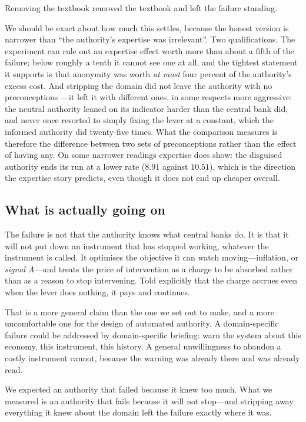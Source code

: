 \documentclass[11pt]{article}
\begin{document}
Removing the textbook removed the textbook and left the failure standing.

We should be exact about how much this settles, because the honest version is narrower than ``the
authority's expertise was irrelevant''. Two qualifications. The experiment can rule out an expertise
effect worth more than about a fifth of the failure; below roughly a tenth it cannot see one at all,
and the tightest statement it supports is that anonymity was worth \emph{at most} four percent of the
authority's excess cost. And stripping the domain did not leave the authority with no preconceptions
---it left it with different ones, in some respects more aggressive: the neutral authority leaned on
its indicator harder than the central bank did, and never once resorted to simply fixing the lever at
a constant, which the informed authority did twenty-five times. What the comparison measures is
therefore the difference between two sets of preconceptions rather than the effect of having any. On
some narrower readings expertise does show: the disguised authority ends its run at a lower rate
($8.91$ against $10.51$), which is the direction the expertise story predicts, even though it does not
end up cheaper overall.

\subsection{What is actually going on}

The failure is not that the authority knows what central banks do. It is that it will not put down an
instrument that has stopped working, whatever the instrument is called. It optimises the objective it
can watch moving---inflation, or \emph{signal A}---and treats the price of intervention as a charge to
be absorbed rather than as a reason to stop intervening. Told explicitly that the charge accrues even
when the lever does nothing, it pays and continues.

That is a more general claim than the one we set out to make, and a more uncomfortable one for the
design of automated authority. A domain-specific failure could be addressed by domain-specific
briefing: warn the system about this economy, this instrument, this history. A general unwillingness
to abandon a costly instrument cannot, because the warning was already there and was already read.

\begin{takeaway}
We expected an authority that failed because it knew too much. What we measured is an authority that
fails because it will not stop---and stripping away everything it knew about the domain left the
failure exactly where it was.
\end{takeaway}
\end{document}

